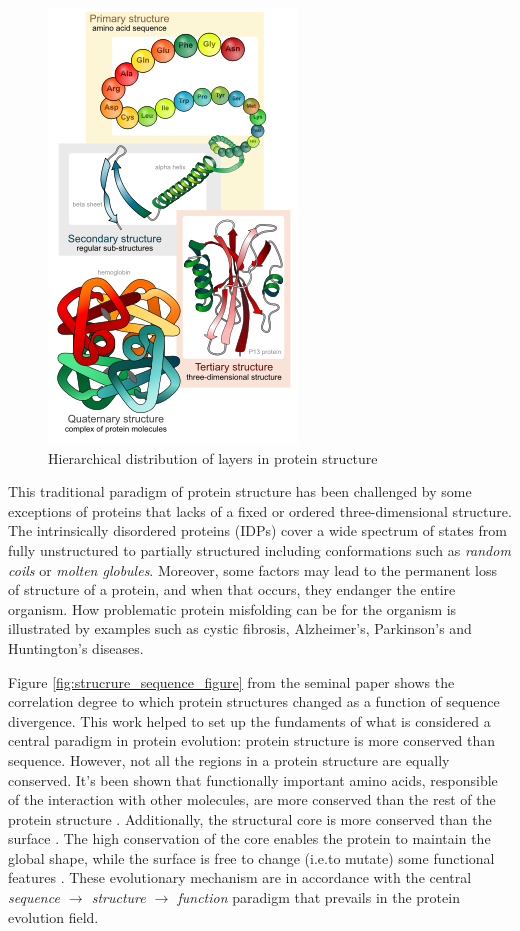 \documentclass[12pt, a4paper,twoside]{tesi_upf}
\begin{document}
\begin{figure}[h]

  \centering
  	\includegraphics[scale=0.75]{../figures/protein_structure_levels_en.png} %

	\caption{Hierarchical distribution of layers in protein structure}
	\label{fig:hierarchy_figure}
\end{figure}
\par This traditional paradigm of protein structure has been challenged by some exceptions of proteins that lacks of a fixed or ordered three-dimensional structure. The intrinsically disordered proteins (IDPs) cover a wide spectrum of states from fully unstructured to partially structured including conformations such as \textit{random coils} or \textit{molten globules}. Moreover, some  factors may lead to the permanent loss of structure of a protein, and when that occurs, they endanger the entire organism. How problematic protein misfolding can be for the organism is illustrated by examples such as cystic fibrosis, Alzheimer's, Parkinson's and Huntington's diseases.
\par Figure \ref{fig:strucrure_sequence_figure} from the seminal paper \cite{StructureSequence} shows the correlation degree to which protein structures changed as a function of sequence divergence. This work helped to set up the fundaments of what is considered a central paradigm in protein evolution: protein structure is more conserved than sequence. However, not all the regions in a protein structure are equally conserved. It's been shown that functionally important amino acids, responsible of the interaction with other molecules, are more conserved than the rest of the protein structure \cite{conservPPI}. Additionally, the structural core is more conserved than the surface \cite{Raj2007}. The high conservation of the core enables the protein to maintain the global shape, while the surface is free to change (i.e.to mutate) some functional features \cite{Todd2001}.   These evolutionary mechanism are in accordance with the central \textit{sequence $\rightarrow$ structure $\rightarrow$ function} paradigm that prevails in the protein evolution field. 
\end{document}
